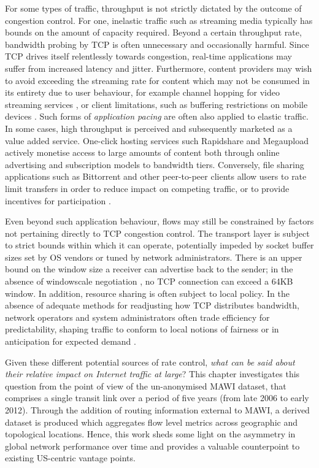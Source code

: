 For some types of traffic, throughput is not strictly dictated by the outcome of congestion control.
For one, inelastic traffic such as streaming media typically has bounds on the amount of capacity required.
Beyond a certain throughput rate, bandwidth probing by \ac{TCP} is often unnecessary and occasionally harmful.
Since \ac{TCP} drives itself relentlessly towards congestion, real-time applications may suffer from increased latency and jitter.
Furthermore, content providers may wish to avoid exceeding the streaming rate for content which may not be consumed in its entirety due to user behaviour, for example channel hopping for video streaming services \cite{iptvWorkload}, or client limitations, such as buffering restrictions on mobile devices \cite{Rao:2011p547}.
Such forms of \emph{application pacing} are often also applied to elastic traffic.
In some cases, high throughput is perceived and subsequently marketed as a value added service.
One-click hosting services such Rapidshare and Megaupload \cite{oneclick1, SanjuasCuxart:2012p588} actively monetise access to large amounts of content both through online advertising and subscription models to bandwidth tiers.
Conversely, file sharing applications such as Bittorrent and other peer-to-peer clients allow users to rate limit transfers in order to reduce impact on competing traffic, or to provide incentives for participation \cite{bittorrentIMC}.

Even beyond such application behaviour, flows may still be constrained by factors not pertaining directly to \ac{TCP} congestion control.
The transport layer is subject to strict bounds within which it can operate, potentially impeded by socket buffer sizes set by \acf{OS} vendors or tuned by network administrators. 
There is an upper bound on the window size a receiver can advertise back to the sender; in the absence of windowscale negotiation \cite{braden1989rfc}, no \ac{TCP} connection can exceed a 64KB window. 
In addition, resource sharing is often subject to local policy.
In the absence of adequate methods for readjusting how \ac{TCP} distributes bandwidth, network operators and system administrators often trade efficiency for predictability, shaping traffic to conform to local notions of fairness or in anticipation for expected demand \cite{ispTrafficShaping}.

Given these different potential sources of rate control, \emph{what can be said about their relative impact on Internet traffic at large}?
This chapter investigates this question from the point of view of the un-anonymised \acs{MAWI} dataset, that comprises a single transit link over a period of five years (from late 2006 to early 2012). 
Through the addition of routing information external to \acs{MAWI}, a derived dataset is produced which aggregates flow level metrics across geographic and topological locations. 
Hence, this work sheds some light on the asymmetry in global network performance over time and provides a valuable counterpoint to existing US-centric vantage points.

